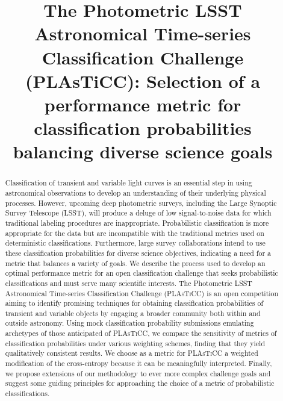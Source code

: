 \documentclass[\docopts]{\docclass}
\begin{document}

\title{The Photometric LSST Astronomical Time-series Classification Challenge (PLA\MakeLowercase{s}T\MakeLowercase{i}CC): Selection of a performance metric for classification probabilities balancing diverse science goals}

\maketitlepre

\begin{abstract}

  Classification of transient and variable light curves is an essential step in using astronomical observations to develop an understanding of their underlying physical processes.
  However, upcoming deep photometric surveys, including the Large Synoptic Survey Telescope (\textsc{LSST}), will produce a deluge of low signal-to-noise data for which traditional labeling procedures are inappropriate.
  Probabilistic classification is more appropriate for the data but are incompatible with the traditional metrics used on deterministic classifications.
  Furthermore, large survey collaborations intend to use these classification probabilities for diverse science objectives, indicating a need for a metric that balances a variety of goals.
  We describe the process used to develop an optimal performance metric for an open classification challenge that seeks probabilistic classifications and must serve many scientific interests.
  The Photometric \textsc{LSST} Astronomical Time-series Classification Challenge (\textsc{PLAsTiCC}) is an open competition aiming to identify promising techniques for obtaining classification probabilities of transient and variable objects by engaging a broader community both within and outside astronomy.
  Using mock classification probability submissions emulating archetypes of those anticipated of \textsc{PLAsTiCC}, we compare the sensitivity of metrics of classification probabilities under various weighting schemes, finding that they yield qualitatively consistent results.
  We choose as a metric for \textsc{PLAsTiCC} a weighted modification of the cross-entropy because it can be meaningfully interpreted.
  Finally, we propose extensions of our methodology to ever more complex challenge goals and suggest some guiding principles for approaching the choice of a metric of probabilistic classifications.

\end{abstract}

\dockeys{}

\maketitlepost
\end{document}
